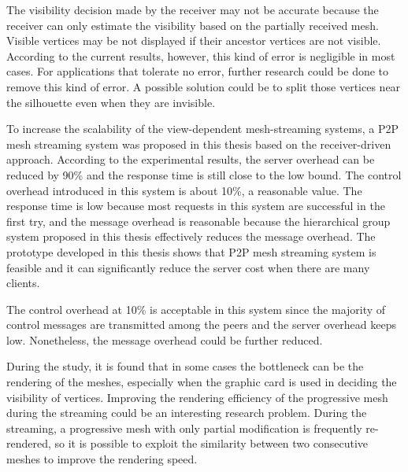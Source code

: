 \documentclass[11pt, a4paper]{report}
\begin{document}
The visibility decision made by the receiver may not be accurate 
because the receiver can only estimate the visibility based on
the partially received mesh. 
Visible vertices may be not displayed if their ancestor vertices are not visible. 
According to the current results, however, this kind of error is negligible in most cases. 
For applications that tolerate no error, 
further research could be done to remove this kind of error. 
A possible solution could be to split those vertices near the silhouette even when they are invisible.

To increase the scalability of the view-dependent mesh-streaming systems, 
a P2P mesh streaming system was proposed in this thesis based on the receiver-driven approach. 
According to the experimental results, the server overhead can be reduced by 90\%
and the response time is still close to the low bound. 
The control overhead introduced in this system is about 10\%, a reasonable value. 
The response time is low because most requests in this system are successful in the first try, 
and the message overhead is reasonable because the hierarchical group system proposed in this thesis effectively 
reduces the message overhead. 
The prototype developed in this thesis shows that P2P mesh streaming system is feasible
and it can significantly reduce the server cost when there are many clients.

The control overhead at 10\% is acceptable in this system since the majority of
control messages are transmitted among the peers and the server overhead keeps low. 
Nonetheless, the message overhead could be further reduced. 

During the study, it is found that in some cases the bottleneck can be the rendering of the meshes, 
especially when the graphic card is used in deciding the visibility of vertices. 
Improving the rendering efficiency of the progressive mesh during the streaming 
could be an interesting research problem.  
During the streaming, a progressive mesh with only partial modification is frequently re-rendered, 
so it is possible to exploit the similarity between two consecutive meshes to improve the rendering speed.


\end{document}
